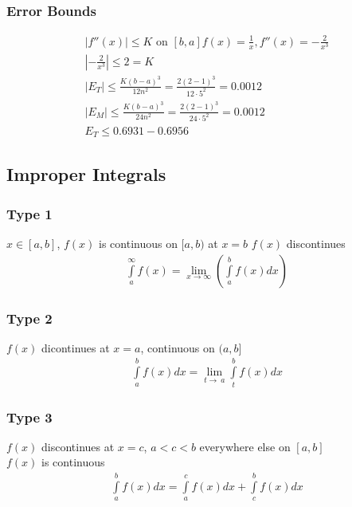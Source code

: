 \documentclass[12pt, letterpaper]{article}
\begin{document}
\subsubsection{Error Bounds}
\begin{gather*}
  |f''(x)| \leq K \text{ on } [b,a] f(x) = \frac{1}{x}, f''(x)=-\frac{2}{x^3}\\
  \left |-\frac{2}{x^3} \right | \leq 2 = K\\
  |E_T| \leq \frac{K(b-a)^3}{12n^2} = \frac{2(2-1)^3}{12 \cdot 5^2} = 0.0012\\
  |E_M| \leq \frac{K(b-a)^3}{24n^2} = \frac{2(2-1)^3}{24 \cdot 5^2} = 0.0012\\
  E_T \leq 0.6931-0.6956
\end{gather*}

\subsection{Improper Integrals}
\subsubsection{Type 1}
$x \in [a,b]$, $f(x)$ is continuous on $[a,b)$ at $x=b$ $f(x)$ discontinues
\begin{gather*}
  \int \limits _{a}^{\infty} f(x) = \lim_{x\to\infty} \left ( \int \limits _{a}^{b} f(x) dx \right )
\end{gather*}

\subsubsection{Type 2}
$f(x)$ dicontinues at $x=a$, continuous on $(a,b]$
\begin{gather*}
  \int \limits _{a}^{b} f(x)dx = \lim_{t\to\ a} \int \limits _{t}^{b} f(x) dx
\end{gather*}

\subsubsection{Type 3}
$f(x)$ discontinues at $x=c$, $a<c<b$ everywhere else on $[a,b]$\\
$f(x)$ is continuous
\begin{gather*}
  \int \limits _{a}^{b} f(x)dx = \int \limits _{a}^{c} f(x)dx + \int \limits _{c}^{b} f(x)dx
\end{gather*}
\end{document}
